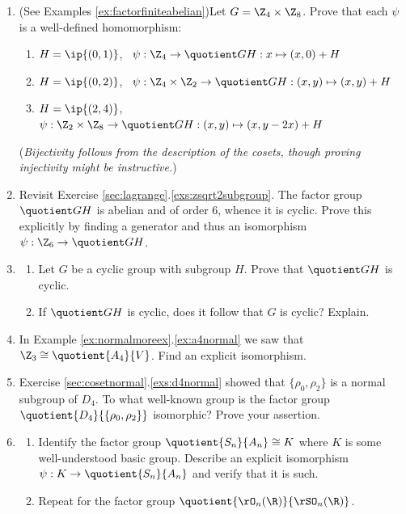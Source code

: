 \begin{exercises}
\begin{enumerate}
	
	 	\item (See Examples \ref{ex:factorfiniteabelian})\lstsp Let $G=\Z_4\times\Z_8$. Prove that each $\psi$ is a well-defined homomorphism:
		\begin{enumerate}\itemsep0pt
			\item $H=\ip{(0,1)}$, \ $\psi:\Z_4\to\quotient GH:x\mapsto (x,0)+H$
			\item $H=\ip{(0,2)}$, \ $\psi:\Z_4\times\Z_2\to\quotient GH:(x,y)\mapsto (x,y)+H$
			\item $H=\ip{(2,4)}$, \ $\psi:\Z_2\times\Z_8\to\quotient GH:(x,y)\mapsto (x,y-2x)+H$
		\end{enumerate}
		(\emph{Bijectivity follows from the description of the cosets, though proving injectivity might be instructive.})
		
		
		\item Revisit Exercise \ref*{sec:lagrange}.\ref{exs:zsqrt2subgroup}. The factor group $\quotient GH$ is abelian and of order 6, whence it is cyclic. Prove this explicitly by finding a generator and thus an isomorphism $\psi:\Z_6\to\quotient GH$.
		
		
		\item\begin{enumerate}
	  	\item Let $G$ be a cyclic group with subgroup $H$. Prove that $\quotient GH$ is cyclic.
	  	\item If $\quotient GH$ is cyclic, does it follow that $G$ is cyclic? Explain.
		\end{enumerate}
	
	
		\item In Example \ref*{ex:normalmoreex}.\ref{ex:a4normal} we saw that $\Z_3\cong\quotient{A_4}{V}$. Find an explicit isomorphism.
			
	
		\item Exercise \ref*{sec:cosetnormal}.\ref{exs:d4normal} showed that $\{\rho_0,\rho_2\}$ is a normal subgroup of $D_4$. To what well-known group is the factor group $\quotient{D_4}{\{\rho_0,\rho_2\}}$ isomorphic? Prove your assertion.
		
	
		\item\begin{enumerate}
		  \item Identify the factor group $\quotient{S_n}{A_n}\cong K$ where $K$ is some well-understood basic group. Describe an explicit isomorphism $\psi:K\to\quotient{S_n}{A_n}$ and verify that it is such.
		  \item Repeat for the factor group $\quotient{\rO_n(\R)}{\rSO_n(\R)}$.
		\end{enumerate}
		

\end{enumerate}
\end{exercises}
